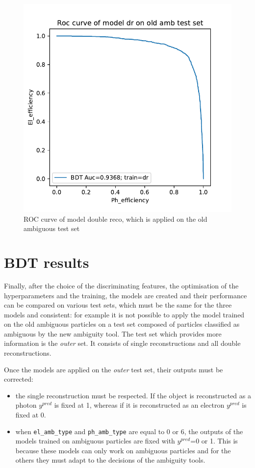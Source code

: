 \documentclass[a4paper, oneside]{book}
\begin{document}
			\begin{figure}[H] 
				\centering
				\includegraphics[width=.6\linewidth]{tesi_images/dr_old.pdf} 
				\caption{ROC curve of model double reco, which is applied on the old ambiguous test set} 
				\label{fig:ex_roc}
			\end{figure}
		\section{BDT results}
			Finally, after the choice of the discriminating features, the optimisation of the hyperparameters and the training, the models are created and their performance can be compared on various test sets, which must be the same for the three models and consistent: for example it is not possible to apply the model trained on the old ambiguous particles on a test set composed of particles classified as ambiguous by the new ambiguity tool. The test set which provides more information is the \textit{outer} set. It consists of single reconstructions and all double reconstructions.
			
			Once the models are applied on the \textit{outer} test set, their outputs must be corrected:
			\begin{itemize}
				\item the single reconstruction must be respected. If the object is reconstructed as a photon $y^{pred}$ is fixed at 1, whereas if it is reconstructed as an electron $y^{pred}$ is fixed at 0.
				\item when \texttt{el\_amb\_type} and \texttt{ph\_amb\_type} are equal to 0 or 6, the outputs of the models trained on ambiguous particles are fixed with $y^{pred}$=0 or 1. This is because these models can only work on ambiguous particles and for the others they must adapt to the decisions of the ambiguity tools.
			\end{itemize}
			
\end{document}
